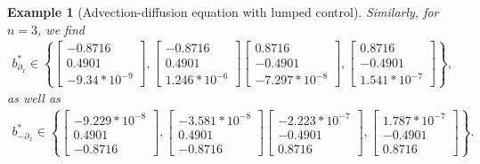 \documentclass[11pt, a4paper, reqno]{amsart}
\newcommand{\del}{\partial}
\theoremstyle{plain}
\numberwithin{equation}{section}
\newtheorem{example}{Example}[section]
\begin{document}
\begin{example}[Advection-diffusion equation with lumped control]
	Similarly, for $n=3$, we find
	\begin{align} \label{eq: max.ex.2.2}
	b^*_{\del_x} \in \left\{\begin{bmatrix}-0.8716\\0.4901\\-9.34*10^{-9}\end{bmatrix}, \begin{bmatrix}-0.8716\\0.4901\\1.246*10^{-6}\end{bmatrix}\begin{bmatrix}0.8716\\-0.4901\\-7.297*10^{-8}\end{bmatrix}, \begin{bmatrix} 0.8716\\-0.4901\\1.541*10^{-7}\end{bmatrix}\right\},
	\end{align}
	as well as 
	\begin{align} \label{eq: max.ex.2.2.1}
	b^*_{-\del_x} \in \left\{\begin{bmatrix}-9.229*10^{-8}\\0.4901\\ -0.8716\end{bmatrix}, \begin{bmatrix}-3.581*10^{-8}\\0.4901\\ -0.8716\end{bmatrix}\begin{bmatrix}-2.223*10^{-7}\\-0.4901\\0.8716\end{bmatrix}, \begin{bmatrix}1.787*10^{-7}\\-0.4901\\0.8716\end{bmatrix}\right\}.
	\end{align}
	

\end{example}
\end{document}
